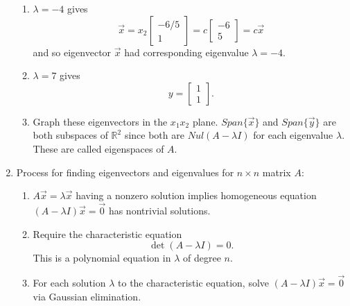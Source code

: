 \documentclass{article}
\begin{document}
\begin{enumerate}
\begin{enumerate}
\item $\lambda = -4$ gives
\[
\vec{x} = x_2 \left[
\begin{array}{c}
-6/5 \\ 1
\end{array}
\right] = 
c \left[
\begin{array}{c}
-6 \\ 5
\end{array}
\right] = c\vec{x}
\]
and so eigenvector $\vec{x}$ had corresponding eigenvalue $\lambda = -4$.

\item $\lambda = 7$ gives
\[
y = \left[
\begin{array}{c}
1 \\ 1
\end{array}
\right].
\]

\item Graph these eigenvectors in the $x_1 x_2$ plane. $Span\{ \vec{x} \}$ and $Span \{ \vec{y} \}$ are both subspaces of $\mathbb{R}^2$ since both are $Nul(A-\lambda I)$ for each eigenvalue $\lambda$. These are called eigenspaces of $A$. 
\end{enumerate}

\item Process for finding eigenvectors and eigenvalues for $n \times n$ matrix $A$:
\begin{enumerate}
\item $A\vec{x} = \lambda \vec{x}$ having a nonzero solution implies homogeneous equation $(A-\lambda I)\vec{x} = \vec{0}$ has nontrivial solutions.
\item Require the characteristic equation
\[
\det(A-\lambda I) = 0.
\]
This is a polynomial equation in $\lambda$ of degree $n$.
\item For each solution $\lambda$ to the characteristic equation, solve  $(A-\lambda I)\vec{x} = \vec{0}$ via Gaussian elimination.
\end{enumerate}


\end{enumerate}
\end{document}
